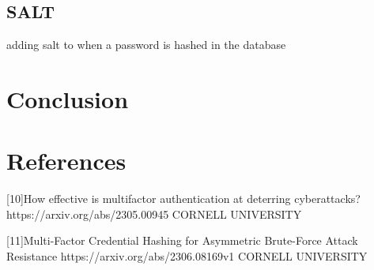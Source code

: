 \documentclass{comjnl}
\begin{document}
\subsection{SALT}
adding salt to when a password is hashed in the database

\section{Conclusion}

\section{References}
[10]How effective is multifactor authentication at deterring cyberattacks? https://arxiv.org/abs/2305.00945 CORNELL UNIVERSITY

[11]Multi-Factor Credential Hashing for Asymmetric Brute-Force Attack Resistance https://arxiv.org/abs/2306.08169v1 CORNELL UNIVERSITY





\end{document}
